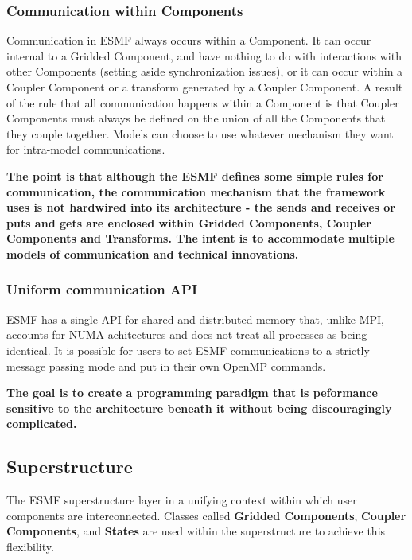 \subsubsection{Communication within Components}
Communication in ESMF always occurs within a Component.  It
can occur internal to a Gridded Component, and have nothing to do 
with interactions with other Components (setting aside 
synchronization issues), or it can occur within a Coupler Component
or a transform generated by a Coupler Component.  A result of the rule 
that all communication happens within a Component is that 
Coupler Components must always be defined on the union of all the
Components that they couple together.  Models can choose to 
use whatever mechanism they want for intra-model communications.  

{\bf The point is that although the ESMF defines some simple rules 
for communication, the communication mechanism that the 
framework uses is not hardwired into its architecture -
the sends and receives or puts and gets are enclosed within 
Gridded Components, Coupler Components and Transforms. The intent
is to accommodate multiple models of communication and technical 
innovations.}

\subsubsection{Uniform communication API}
ESMF has a single API for shared and distributed
memory that, unlike MPI, accounts for NUMA achitectures and 
does not treat all processes as being identical.  It is possible for
users to set ESMF communications to a strictly message passing 
mode and put in their own OpenMP commands.

{\bf The goal is to create a programming paradigm 
that is peformance sensitive to the architecture beneath it 
without being discouragingly complicated.}

\subsection{Superstructure}
\label{sec:superstructure}
The ESMF superstructure layer in a unifying context within which user 
components are interconnected. Classes called {\bf Gridded Components}, 
{\bf Coupler Components}, and {\bf States} are used within the superstructure 
to achieve this flexibility.

